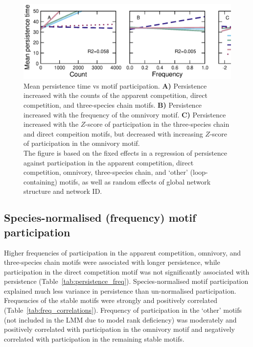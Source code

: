 \documentclass[12pt]{article}
\begin{document}
\begin{spacing}{2.0}
    \begin{figure}[h!]
        \centering
        \includegraphics[width=\textwidth]{figures/roles/persistence_vs_motifs.eps}
        \caption{Mean persistence time vs motif participation. \textbf{A)} Persistence increased with the counts of the apparent competition, direct competition, and three-species chain motifs. \textbf{B)} Persistence increased with the frequency of the omnivory motif. \textbf{C)} Persistence increased with the $Z$-score of participation in the three-species chain and direct compeition motifs, but decreased with increasing $Z$-score of participation in the omnivory motif. \\The figure is based on the fixed effects in a regression of persistence against participation in the apparent competition, direct competition, omnivory, three-species chain, and `other' (loop-containing) motifs, as well as random effects of global network structure and network ID.}
        \label{fig:persistence_motifs}
    \end{figure}

	\subsection*{Species-normalised (frequency) motif participation}

		Higher frequencies of participation in the apparent competition, omnivory, and three-species chain motifs were associated with longer persistence, while participation in the direct competition motif was not significantly associated with persistence (Table~\ref{tab:persistence_freq}).
		Species-normalised motif participation explained much less variance in persistence than un-normalised participation.
		Frequencies of the stable motifs were strongly and positively correlated (Table~\ref{tab:freq_correlations}).
		Frequency of participation in the `other' motifs (not included in the LMM due to model rank deficiency) was moderately and positively correlated with participation in the omnivory motif and negatively correlated with participation in the remaining stable motifs.



\end{spacing}
\end{document}
